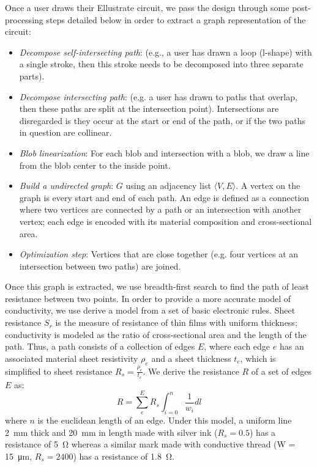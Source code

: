 \documentclass{sigchi}
\begin{document}
    Once a user draws their Ellustrate circuit, we pass the design through some post-processing steps detailed below in order to extract a graph representation of the circuit: 
    \begin{itemize}
        \item \textit{Decompose self-intersecting path}:  (e.g., a user has drawn a loop (l-shape) with a single stroke, then this stroke needs to be decomposed into three separate parts). 
        \item \textit{Decompose intersecting path}:  (e.g. a user has drawn to paths that overlap, then these paths are split at the intersection point). Intersections are disregarded is they occur at the start or end of the path, or if the two paths in question are collinear. 
        \item \textit{Blob linearization}: For each blob and intersection with a blob, we draw a line from the blob center to the inside point.
        \item \textit{Build a undirected graph}: $G$ using an adjacency list $\langle V, E \rangle$. A vertex on the graph is every start and end of each path. An edge is defined as a connection where two vertices are connected by a path or an intersection with another vertex; each edge is encoded with its material composition and cross-sectional area. 
        \item \textit{Optimization step}: Vertices that are close together (e.g. four vertices at an intersection between two paths) are joined. 
    \end{itemize}
    Once this graph is extracted, we use breadth-first search to find the path of least resistance  between two points. In order to provide a more accurate model of conductivity, we use derive a model from a set of basic electronic rules. Sheet resistance $S_r$ is the measure of resistance of thin films with uniform thickness; conductivity is modeled as the ratio of cross-sectional area and the length of the path. Thus, a path consists of a collection of edges $E$, where each edge $e$ has an associated material sheet resistivity $\rho_e$ and a sheet thickness $t_e$, which is simplified to sheet resistance $R_s = \frac{\rho_e}{t_e}$. We derive the resistance $R$ of a set of edges $E$ as: 
    \begin{equation}
        R =  \sum^{E}_e R_s \int_{i=0}^{n}  \frac{1}{w_i} dl
    \label{eq:resistance}
    \end{equation} 
    where $n$ is the euclidean length of an edge. Under this model, a uniform line \SI{2}{\milli\metre} thick and \SI{20}{\milli\metre} in length made with silver ink ($R_s = 0.5$) has a resistance of \SI{5}{\ohm} whereas a similar mark made with conductive thread (W = \SI{15}{\micro\metre}, $R_s = 2400$) has a resistance of \SI{1.8}{\ohm}.
    
\end{document}
